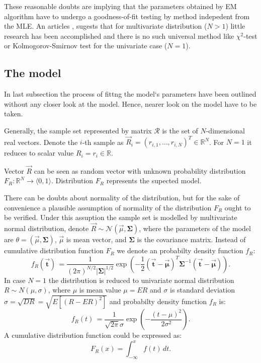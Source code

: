 \documentclass[a4paper,journal]{IEEEtran}
\begin{document}
These reasonable doubts are implying that the parameters obtained by EM algorithm have to undergo a goodness-of-fit
testing by method indepedent from the MLE.
An articles \cite{Nar03}, \cite{Ros62} sugests that for multivariate distribution ($N > 1$) little research
has been accomplished and there is no such universal method like $\chi^2$-test or  Kolmogorov-Smirnov test
for the univariate case ($N=1$). 


\subsection{The model}
In last subsection the process of fittng the model`s parameters have been outlined without any closer look at the model.
Hence, nearer look on the model have to be taken.

Generally, the sample set represented by matrix  $\mathcal{R}$ is the set of $N$-dimensional real vectors.
Denote the $i$-th sample as $\vec{R}_i = (r_{i,1},\ldots,r_{i,N})^T \in  \mathbb{R}^N$.
For $N=1$ it reduces to scalar value $R_i = r_{i} \in  \mathbb{R} $.

Vector $\vec{R}$ can be seen as random vector with unknown probability distribution
$F_R: \mathbb{R}^N \rightarrow \langle 0, 1 \rangle $. Distribution $F_R$ represents the supected model.

There can be doubts about normality of the distribution, but for the sake of convenience a plausible assumption of 
normality of the distribution $F_R$  ought to be verified. Under this assuption the sample set is modelled by multivariate 
normal distribution, denote $\vec{R} \sim \mathcal{N}(\vec{\mu},\mathbf \Sigma)$, where the parameters of the model are 
$\theta = (\vec{\mu}, \mathbf\Sigma)$, $\vec{\mu}$ is mean vector, and $\mathbf\Sigma$ is the covariance matrix. 
Instead of cumulative distribution function $F_R$ we denote an probabilty density function $f_R$:
\begin{equation}
f_R(\vec{\mathbf{t}})\, =
\frac{1}{(2\pi)^{N/2}|\mathbf\Sigma|^{1/2}}
\exp \left(-\frac{1}{2}({\mathbf{\vec t}}-{\mathbf{\vec\mu}})^T{\mathbf\Sigma}^{-1}({\mathbf{\vec t}}-\mathbf{\vec\mu})
\right).
\end{equation}
In case $N=1$ the distribution is reduced to univariate normal distribution $R \sim N(\mu,\sigma)$, where $\mu$ is 
mean value $\mu = ER$ and $\sigma$ is standard deviation $\sigma = \sqrt{DR} = \sqrt{E[(R - ER)^2] }$ and 
probabilty density function $f_R$ is:
\begin{equation}
f_R(t)\, =
\frac{1}{\sqrt{2\pi}\sigma}
\exp \left(-\frac{(t-\mu)^2}{2\sigma^2}
\right).
\end{equation}
A cumulative distribution function could be expressed as:
\begin{equation}
F_R(x) = \int_{-\infty}^x f(t)\,dt.
\end{equation}
\end{document}
